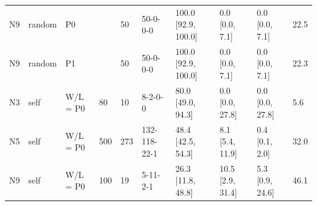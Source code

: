 \begin{table}[htbp]
\begin{tabular}{llllllllll}
N9 & random & P0 &  & 50 & 50-0-0-0 & 100.0 [92.9, 100.0] & 0.0 [0.0, 7.1] & 0.0 [0.0, 7.1] & 22.5 \\
N9 & random & P1 &  & 50 & 50-0-0-0 & 100.0 [92.9, 100.0] & 0.0 [0.0, 7.1] & 0.0 [0.0, 7.1] & 22.3 \\
N3 & self & W/L = P0 & 80 & 10 & 8-2-0-0 & 80.0 [49.0, 94.3] & 0.0 [0.0, 27.8] & 0.0 [0.0, 27.8] & 5.6 \\
N5 & self & W/L = P0 & 500 & 273 & 132-118-22-1 & 48.4 [42.5, 54.3] & 8.1 [5.4, 11.9] & 0.4 [0.1, 2.0] & 32.0 \\
N9 & self & W/L = P0 & 100 & 19 & 5-11-2-1 & 26.3 [11.8, 48.8] & 10.5 [2.9, 31.4] & 5.3 [0.9, 24.6] & 46.1 \\
\bottomrule
\end{tabular}
\end{table}
